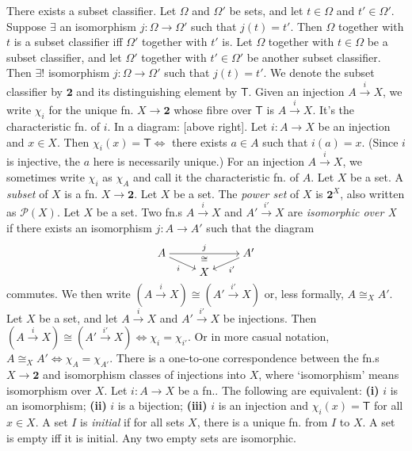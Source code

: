  There exists a subset classifier.
 Let $\Omega$ and $\Omega'$ be sets, and let $t \in \Omega$ and $t' \in \Omega'$. Suppose $\exists$ an isomorphism $j \colon \Omega \to \Omega'$ such that $j(t) = t'$. Then $\Omega$ together with $t$ is a subset classifier iff $\Omega'$ together with $t'$ is.
 Let $\Omega$ together with $t \in \Omega$ be a subset classifier, and let $\Omega'$ together with $t' \in \Omega'$ be another subset classifier. Then $\exists!$ isomorphism $j \colon \Omega \to \Omega'$ such that $j(t) = t'$.
 We denote the subset classifier by $\mathbf{2}$ and its distinguishing element by $\textsf{T}$. Given an injection $A \xrightarrow{i} X$, we write $\chi_i$ for the unique fn. $X \to \mathbf{2}$ whose fibre over $\mathsf{T}$ is $A \xrightarrow{i} X$. It's the characteristic fn. of $i$. In a diagram: [above right].
 Let $i \colon A \to X$ be an injection and $x \in X$. Then $\chi_i(x) = \mathsf{T} \iff$ there exists $a \in A$ such that $i(a) = x$. (Since $i$ is injective, the $a$ here is necessarily unique.)
 For an injection $A \xrightarrow{i} X$, we sometimes write $\chi_i$ as $\chi_A$ and call it the characteristic fn. of $A$.
 Let $X$ be a set. A \textit{subset} of $X$ is a fn. $X \to \mathbf{2}$.
 Let $X$ be a set. The \textit{power set} of $X$ is $\mathbf{2}^X$, also written as $\mathscr{P}(X)$.
 Let $X$ be a set. Two fn.s $A \xrightarrow{i} X$ and $A' \xrightarrow{i'} X$ are \textit{isomorphic over X} if there exists an isomorphism $j \colon A \to A'$ such that the diagram
\[\begin{tikzcd}[cramped,row sep=tiny]
    A && {A'} \\
    & X
    \arrow["j", "\cong"', from=1-1, to=1-3]
    \arrow["i"', from=1-1, to=2-2]
    \arrow["{i'}", from=1-3, to=2-2]
\end{tikzcd}\]
commutes. We then write $(A \xrightarrow{i} X) \cong (A' \xrightarrow{i'} X)$ or, less formally, $A \cong_X A'$.
 Let $X$ be a set, and let $A \xrightarrow{i} X$ and $A' \xrightarrow{i'} X$ be injections. Then $(A \xrightarrow{i} X) \cong (A' \xrightarrow{i'} X) \iff \chi_i = \chi_{i'}$. Or in more casual notation, $A \cong_X A' \iff \chi_A = \chi_{A'}$.
 There is a one-to-one correspondence between the fn.s $X \to \mathbf{2}$ and isomorphism classes of injections into $X$, where `isomorphism' means isomorphism over $X$.
 Let $i \colon A \to X$ be a fn.. The following are equivalent: \textbf{(i)} $i$ is an isomorphism; \textbf{(ii)} $i$ is a bijection; \textbf{(iii)} $i$ is an injection and $\chi_i(x) = \mathsf{T}$ for all $x \in X$.
 A set $I$ is \textit{initial} if for all sets $X$, there is a unique fn. from $I$ to $X$.
 A set is empty iff it is initial.
 Any two empty sets are isomorphic.